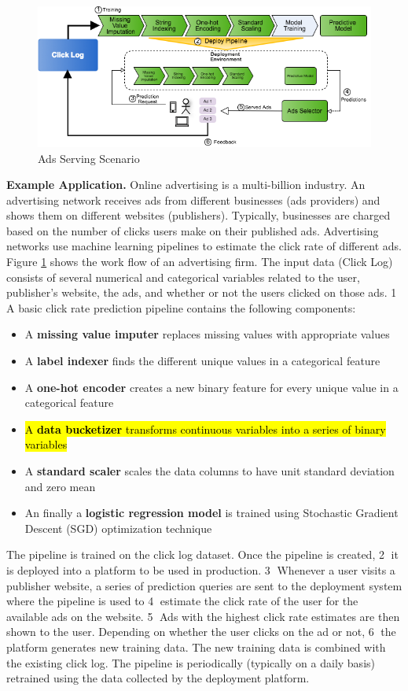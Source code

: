 \begin{figure}[t]
\centering
\includegraphics[width=\columnwidth]{../images/motivational-example.png}
\caption{Ads Serving Scenario}
\label{fig:motivational-example}
\end{figure}
\textbf{Example Application.} 
Online advertising is a multi-billion industry.
An advertising network receives ads from different businesses (ads providers) and shows them on different websites (publishers).
Typically, businesses are charged based on the number of clicks users make on their published ads.
Advertising networks use machine learning pipelines to estimate the click rate of different ads.
Figure \ref{fig:motivational-example} shows the work flow of an advertising firm.
The input data (Click Log) consists of several numerical and categorical variables related to the user, publisher's website,  the ads,  and whether or not the users clicked on those ads.
\textcircled{1} A basic click rate prediction pipeline contains the following components:
\begin{itemize}
\item A \textbf{missing value imputer} replaces missing values with appropriate values
\item A \textbf{label indexer} finds the different unique values in a categorical feature 
\item A \textbf{one-hot encoder} creates a new binary feature for every unique value in a categorical feature
\item \hl{A \textbf{data bucketizer} transforms continuous variables into a series of binary variables}
\item A \textbf{standard scaler} scales the data columns to have unit standard deviation and zero mean
\item An finally a \textbf{logistic regression model} is trained using Stochastic Gradient Descent (SGD) optimization technique
\end{itemize}
The pipeline is trained on the click log dataset.
Once the pipeline is created, \textcircled{2} it is deployed into a platform to be used in production.
\textcircled{3} Whenever a user visits a publisher website, a series of prediction queries are sent to the deployment system where the pipeline is used to \textcircled{4} estimate the click rate of the user for the available ads on the website.
\textcircled{5} Ads with the highest click rate estimates are then shown to the user.
Depending on whether the user clicks on the ad or not, \textcircled{6} the platform generates new training data.
The new training data is combined with the existing click log.
The pipeline is periodically (typically on a daily basis) retrained using the data collected by the deployment platform.

